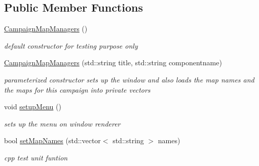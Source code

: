 \subsection*{Public Member Functions}
\begin{DoxyCompactItemize}
\item 
\hypertarget{class_campaign_map_managers_abcb404e7ba4f8725c73c6ec2f3d3c5a6}{}\label{class_campaign_map_managers_abcb404e7ba4f8725c73c6ec2f3d3c5a6} 
\hyperlink{class_campaign_map_managers_abcb404e7ba4f8725c73c6ec2f3d3c5a6}{Campaign\+Map\+Managers} ()
\begin{DoxyCompactList}\small\item\em default constructor for testing purpose only \end{DoxyCompactList}\item 
\hypertarget{class_campaign_map_managers_a28a0d28e3fd4813738cf3a366c25bd16}{}\label{class_campaign_map_managers_a28a0d28e3fd4813738cf3a366c25bd16} 
\hyperlink{class_campaign_map_managers_a28a0d28e3fd4813738cf3a366c25bd16}{Campaign\+Map\+Managers} (std\+::string title, std\+::string componentname)
\begin{DoxyCompactList}\small\item\em parameterized constructor sets up the window and also loads the map names and the maps for this campaign into private vectors \end{DoxyCompactList}\item 
\hypertarget{class_campaign_map_managers_a2884212b091c5827c7bfe808fafb63a6}{}\label{class_campaign_map_managers_a2884212b091c5827c7bfe808fafb63a6} 
void \hyperlink{class_campaign_map_managers_a2884212b091c5827c7bfe808fafb63a6}{setup\+Menu} ()
\begin{DoxyCompactList}\small\item\em sets up the menu on window renderer \end{DoxyCompactList}\item 
\hypertarget{class_campaign_map_managers_a535719f15d56b38ccc5a944232b712ba}{}\label{class_campaign_map_managers_a535719f15d56b38ccc5a944232b712ba} 
bool \hyperlink{class_campaign_map_managers_a535719f15d56b38ccc5a944232b712ba}{set\+Map\+Names} (std\+::vector$<$ std\+::string $>$ names)
\begin{DoxyCompactList}\small\item\em cpp test unit funtion \end{DoxyCompactList}\item 
\hypertarget{class_campaign_map_managers_a6e04b8ac8bbc2872bb0441428e0042b3}{}\label{class_campaign_map_managers_a6e04b8ac8bbc2872bb0441428e0042b3} 

\end{DoxyCompactItemize}
